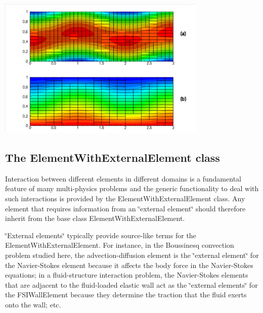  
\begin{DoxyImage}
\includegraphics[width=0.75\textwidth]{two_domains}
\end{DoxyImage}




\hypertarget{index_external_elements}{}\subsection{The Element\+With\+External\+Element class}\label{index_external_elements}
Interaction between different elements in different domains is a fundamental feature of many multi-\/physics problems and the generic functionality to deal with such interactions is provided by the {\ttfamily Element\+With\+External\+Element} class. Any element that requires information from an \char`\"{}external element\char`\"{} should therefore inherit from the base class {\ttfamily Element\+With\+External\+Element}.

\char`\"{}\+External elements\char`\"{} typically provide source-\/like terms for the {\ttfamily Element\+With\+External\+Element}. For instance, in the Boussinesq convection problem studied here, the advection-\/diffusion element is the \char`\"{}external element\char`\"{} for the Navier-\/\+Stokes element because it affects the body force in the Navier-\/\+Stokes equations; in a fluid-\/structure interaction problem, the Navier-\/\+Stokes elements that are adjacent to the fluid-\/loaded elastic wall act as the \char`\"{}external elements\char`\"{} for the {\ttfamily F\+S\+I\+Wall\+Element} because they determine the traction that the fluid exerts onto the wall; etc.

